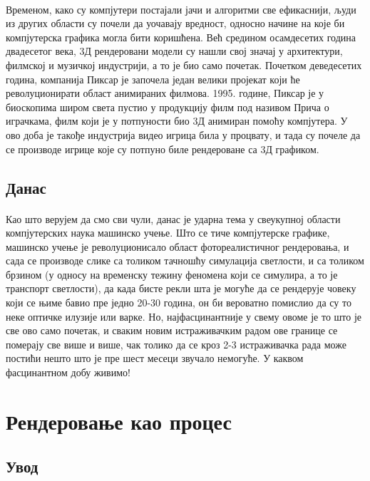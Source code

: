 \documentclass[12pt]{article}
\begin{document}
	\paragraph{}
	Временом, како су компјутери постајали јачи и алгоритми све ефикаснији, људи из других области су почели да уочавају вредност, односно начине на које би компјутерска графика могла бити коришћена. Већ средином осамдесетих година двадесетог века, 3Д рендеровани модели су нашли свој значај у архитектури, филмској и музичкој индустрији, а то је био само почетак. Почетком деведесетих година, компанија Пиксар је започела један велики пројекат који ће револуционирати област анимираних филмова. 1995. године, Пиксар је у биоскопима широм света пустио у продукцију филм под називом Прича о играчкама, филм који је у потпуности био 3Д анимиран помоћу компјутера. У ово доба је такође индустрија видео игрица била у процвату, и тада су почеле да се производе игрице које су потпуно биле рендероване са 3Д графиком.
	
	\subsection{Данас}
	\paragraph{}
	Као што верујем да смо сви чули, данас је ударна тема у свеукупној области компјутерских наука машинско учење. Што се тиче компјутерске графике, машинско учење је револуционисало област фотореалистичног рендеровања, и сада се производе слике са толиком тачношћу симулација светлости, и са толиком брзином (у односу на временску тежину феномена који се симулира, а то је транспорт светлости), да када бисте рекли шта је могуће да се рендерује човеку који се њиме бавио пре једно 20-30 година, он би вероватно помислио да су то неке оптичке илузије или варке. Но, најфасцинантније у свему овоме је то што је све ово само почетак, и сваким новим истраживачким радом ове границе се померају све више и више, чак толико да се кроз 2-3 истраживачка рада може постићи нешто што је пре шест месеци звучало немогуће. У каквом фасцинантном добу живимо!
	
	\section{Рендеровање као процес}
	
	\subsection{Увод}
\end{document}
